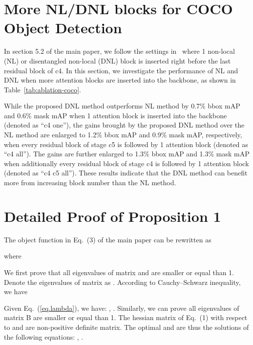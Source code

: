 \documentclass[runningheads]{llncs}
\begin{document}
\section{More NL/DNL blocks for COCO Object Detection}

In section 5.2 of the main paper, we follow the settings in~\cite{wang2018non} where 1 non-local (NL) or disentangled non-local (DNL) block is inserted right before the last residual block of c4. In this section, we investigate the performance of NL and DNL when more attention blocks are inserted into the backbone, as shown in Table~\ref{tab:ablation-coco}.

While the proposed DNL method outperforms NL method by 0.7\% bbox mAP and 0.6\% mask mAP when 1 attention block is inserted into the backbone (denoted as ``c4 one''), the gains brought by the proposed DNL method over the NL method are enlarged to 1.2\% bbox mAP and 0.9\% mask mAP, respectively, when every residual block of stage c5 is followed by 1 attention block (denoted as ``c4 all''). The gains are further enlarged to 1.3\% bbox mAP and 1.3\% mask mAP when additionally every residual block of stage c4 is followed by 1 attention block (denoted as ``c4 c5 all''). These results indicate that the DNL method can benefit more from increasing block number than the NL method.

\section{Detailed Proof of Proposition 1}

The object function  in Eq.~(3) of the main paper can be rewritten as
\begin{small}

\end{small}where
\begin{small}

\end{small}

We first prove that all eigenvalues of matrix  and  are smaller or equal than 1. Denote the eigenvalues of matrix  as .
According to Cauchy–Schwarz inequality, we have
\begin{small}

\end{small}
Given Eq.~(\ref{eq.lambda}), we have: , . Similarly, we can prove all eigenvalues of matrix B are smaller or equal than 1. The hessian matrix of Eq.~(1) with respect to  and  are non-positive definite matrix. The optimal and  are thus the solutions of the following equations: , .
\end{document}
